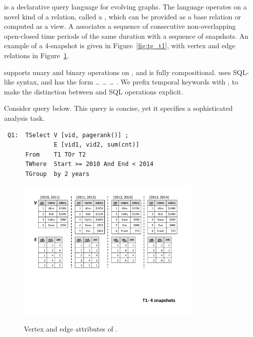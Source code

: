 \ql is a declarative query language for evolving graphs.  The language
operates on a novel kind of a relation, called a \tg, which can be
provided as a base relation or computed as a view.  A \tg associates a
sequence of consecutive non-overlapping open-closed time periods of
the same duration with a sequence of snapshots.  An example of a
4-snapshot \tg is given in Figure~\ref{fig:tg_t1}, with vertex and
edge relations in Figure~\ref{fig:tg_t1_ve}.


\ql supports unary and binary operations on \tgs, and is fully
compositional. \ql uses SQL-like syntax, and has the form
 \ldots {} \ldots {} \ldots
{}.  We prefix temporal keywords with , to make
the distinction between \ql and SQL operations explicit. 


Consider query  below.  This query is concise, yet it
specifies a sophisticated analysis task.

\eat{{\footnotesize}}
\begin{small}
\begin{verbatim}
 Q1:  TSelect V [vid, pagerank()] ; 
              E [vid1, vid2, sum(cnt)] 
      From    T1 TOr T2 
      TWhere  Start >= 2010 And End < 2014 
      TGroup  by 2 years
\end{verbatim}
\end{small}

\begin{figure}[t!]
  \centering
\includegraphics[width=3.5in]{figs/4snaps_T1_ve.pdf}
  \caption{Vertex and edge attributes of \tg {}.}{}
  \label{fig:tg_t1_ve}
\vspace{-0.5cm}
\end{figure}

